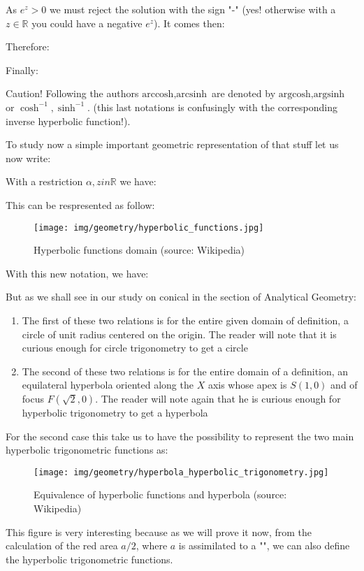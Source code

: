 	As $e^{z}>0$ we must reject the solution with the sign "-" (yes! otherwise with a $z \in \mathbb{R}$ you could have a negative $e^z$). It comes then:
	
	Therefore:
	
		Finally:
	
	
	Caution! Following the authors $\text{arccosh}, \text{arcsinh}$ are denoted by $\text{argcosh}, \text{argsinh}$ or $\cosh^{-1}, \sinh^{-1}$. (this last notations is confusingly with the corresponding inverse hyperbolic function!).
	
	To study now a simple important geometric representation of that stuff let us now write:
	
	With a restriction $\alpha,z in \mathbb{R}$ we have:
	
	This can be respresented as follow:
	\begin{figure}[H]
	\centering
	\texttt{[image: img/geometry/hyperbolic\_functions.jpg]}
	\caption{Hyperbolic functions domain (source: Wikipedia)}
	\end{figure}
	With this new notation, we have:
	
	But as we shall see in our study on conical in the section of Analytical Geometry:
	\begin{enumerate}
		\item The first of these two relations is for the entire given domain of definition, a circle of unit radius centered on the origin. The reader will note that it is curious enough for circle trigonometry to get a circle \Winkey
		\item The second of these two relations is for the entire domain of a definition, an equilateral hyperbola oriented along the $X$ axis whose apex is $S (1,0)$ and of focus $F(\sqrt{2},0)$. The reader will note again that he is curious enough for hyperbolic trigonometry to get a hyperbola \Winkey
	\end{enumerate}
	For the second case this take us to have the possibility to represent the two main hyperbolic trigonometric functions as:
	\begin{figure}[H]
	\centering
	\texttt{[image: img/geometry/hyperbola\_hyperbolic\_trigonometry.jpg]}
	\caption{Equivalence of hyperbolic functions and hyperbola (source: Wikipedia)}
	\end{figure}
	This figure is very interesting because as we will prove it now, from the calculation of the red area $a/2$, where $a$ is assimilated to a "", we can also define the hyperbolic trigonometric functions.
	
